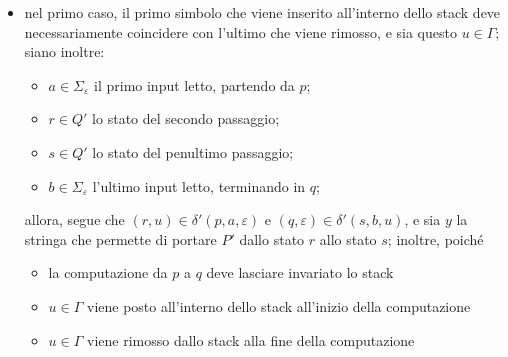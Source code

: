 \documentclass[a4paper, 12pt]{report}
\begin{document}
{\begin{enumerate}[label=]
\begin{enumerate}[label=]
                        \begin{itemize}
                            \item nel primo caso, il primo simbolo che viene inserito all'interno dello stack deve necessariamente coincidere con l'ultimo che viene rimosso, e sia questo $u \in \Gamma$; siano inoltre:
                                \begin{itemize}
                                    \item $a \in \Sigma_\varepsilon$ il primo input letto, partendo da $p$;
                                    \item $r \in Q'$ lo stato del secondo passaggio;
                                    \item $s \in Q'$ lo stato del penultimo passaggio;
                                    \item $b \in \Sigma_\varepsilon$ l'ultimo input letto, terminando in $q$;
                                \end{itemize}

                                allora, segue che $(r, u) \in \delta'(p, a, \varepsilon)$ e $(q, \varepsilon) \in \delta'(s, b, u)$, e sia $y$ la stringa che permette di portare $P'$ dallo stato $r$ allo stato $s$; inoltre, poiché

                                \begin{itemize}
                                    \item la computazione da $p$ a $q$ deve lasciare invariato lo stack
                                    \item $u \in \Gamma$ viene posto all'interno dello stack all'inizio della computazione
                                    \item $u \in \Gamma$ viene rimosso dallo stack alla fine della computazione
                                \end{itemize}


\end{itemize}
\end{enumerate}
\end{enumerate}}
\end{document}
